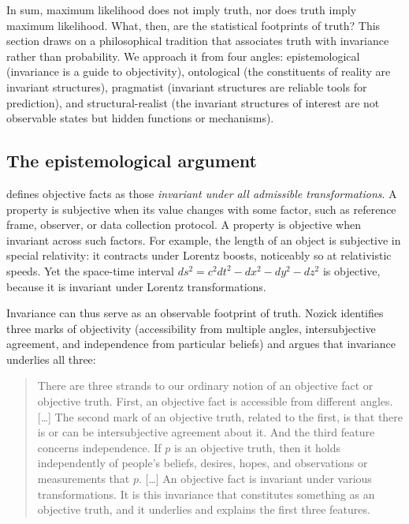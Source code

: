 In sum, maximum likelihood does not imply truth, nor does truth imply maximum likelihood. What, then, are the statistical footprints of truth? This section draws on a philosophical tradition that associates truth with invariance rather than probability. We approach it from four angles: epistemological (invariance is a guide to objectivity), ontological (the constituents of reality are invariant structures), pragmatist (invariant structures are reliable tools for prediction), and structural-realist (the invariant structures of interest are not observable states but hidden functions or mechanisms).

\subsection{The epistemological argument}\label{sec:epist}

\citet{nozick2001} defines objective facts as those \emph{invariant under all admissible transformations}. A property is subjective when its value changes with some factor, such as reference frame, observer, or data collection protocol. A property is objective when invariant across such factors. For example, the length of an object is subjective in special relativity: it contracts under Lorentz boosts, noticeably so at relativistic speeds. Yet the space-time interval $ds^2 = c^2 dt^2 - dx^2 - dy^2 - dz^2$ is objective, because it is invariant under Lorentz transformations.

Invariance can thus serve as an observable footprint of truth. Nozick identifies three marks of objectivity (accessibility from multiple angles, intersubjective agreement, and independence from particular beliefs) and argues that invariance underlies all three:
\begin{quote}
There are three strands to our ordinary notion of an objective fact or objective truth. First, an objective fact is accessible from different angles. [\ldots] The second mark of an objective truth, related to the first, is that there is or can be intersubjective agreement about it. And the third feature concerns independence. If $p$ is an objective truth, then it holds independently of people's beliefs, desires, hopes, and observations or measurements that $p$. [\ldots] An objective fact is invariant under various transformations. It is this invariance that constitutes something as an objective truth, and it underlies and explains the first three features. \citep[pp. 75--76]{nozick2001}
\end{quote}

